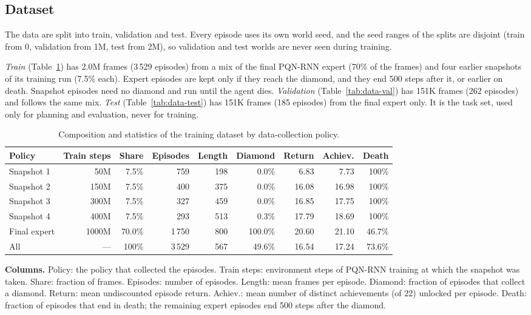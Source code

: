 \subsection{Dataset}
\label{app:dataset}

The data are split into train, validation and test. Every episode uses its
own world seed, and the seed ranges of the splits are disjoint (train from 0,
validation from 1M, test from 2M), so validation and test worlds are never
seen during training.

\emph{Train} (Table~\ref{tab:data-train}) has 2.0M frames (3\,529 episodes)
from a mix of the final PQN-RNN expert (70\% of the frames) and four earlier
snapshots of its training run (7.5\% each). Expert episodes are kept only if
they reach the diamond, and they end 500 steps after it, or earlier on death.
Snapshot episodes need no diamond and run until the agent dies.
\emph{Validation} (Table~\ref{tab:data-val}) has 151K frames (262 episodes)
and follows the same mix. \emph{Test} (Table~\ref{tab:data-test}) has 151K
frames (185 episodes) from the final expert only. It is the task set, used
only for planning and evaluation, never for training.

\begin{table}[H]
\centering
\caption{Composition and statistics of the training dataset by data-collection policy.}
\label{tab:data-train}
\small
\setlength{\tabcolsep}{3.5pt}
\begin{tabular}{lrrrrrrrr}
\toprule
Policy & Train steps & Share & Episodes & Length & Diamond & Return & Achiev. & Death \\
\midrule
Snapshot 1 & 50M & 7.5\% & 759 & 198 & 0.0\% & 6.83 & 7.73 & 100\% \\
Snapshot 2 & 150M & 7.5\% & 400 & 375 & 0.0\% & 16.08 & 16.98 & 100\% \\
Snapshot 3 & 300M & 7.5\% & 327 & 459 & 0.0\% & 16.85 & 17.75 & 100\% \\
Snapshot 4 & 400M & 7.5\% & 293 & 513 & 0.3\% & 17.79 & 18.69 & 100\% \\
Final expert & 1000M & 70.0\% & 1\,750 & 800 & 100.0\% & 20.60 & 21.10 & 46.7\% \\
\midrule
All & --- & 100\% & 3\,529 & 567 & 49.6\% & 16.54 & 17.24 & 73.6\% \\
\bottomrule
\end{tabular}

\vspace{4pt}
\begin{minipage}{\linewidth}
\footnotesize\raggedright
\textbf{Columns.} Policy: the policy that collected the episodes. Train steps: environment steps of PQN-RNN training at which the snapshot was taken. Share: fraction of frames. Episodes: number of episodes. Length: mean frames per episode. Diamond: fraction of episodes that collect a diamond. Return: mean undiscounted episode return. Achiev.: mean number of distinct achievements (of 22) unlocked per episode. Death: fraction of episodes that end in death; the remaining expert episodes end 500 steps after the diamond.
\end{minipage}
\end{table}


